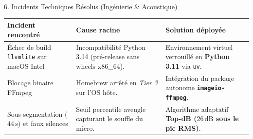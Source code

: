 \documentclass[aspectratio=169,10pt]{beamer}
\begin{document}
\begin{frame}{6. Incidents Techniques Résolus (Ingénierie \& Acoustique)}
\small
\begin{table}[h]
\centering
\begin{tabular}{p{3.5cm}p{4.2cm}p{4.5cm}}
\toprule
\textbf{Incident rencontré} & \textbf{Cause racine} & \textbf{Solution déployée} \\
\midrule
Échec de build \texttt{llvmlite} sur macOS Intel & Incompatibilité Python 3.14 (pré-release sans wheels x86\_64). & Environnement virtuel verrouillé en \textbf{Python 3.11} via \texttt{uv}. \\
\addlinespace
Blocage binaire FFmpeg & Homebrew arrêté en \textit{Tier 3} sur l'OS hôte. & Intégration du package autonome \textbf{\texttt{imageio-ffmpeg}}. \\
\addlinespace
Sous-segmentation ($44\,\text{s}$) et faux silences & Seuil percentile aveugle capturant le souffle du micro. & Algorithme adaptatif \textbf{Top-dB ($26\,\text{dB}$ sous le pic RMS)}. \\
\bottomrule
\end{tabular}
\end{table}
\end{frame}
\end{document}
